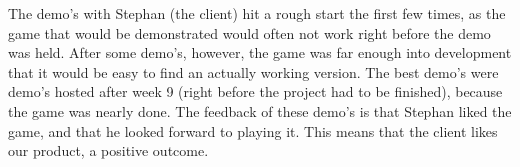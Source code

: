 		The demo's with Stephan (the client) hit a rough start the first few
		times, as the game that would be demonstrated would often not work
		right before the demo was held. After some demo's, however, the game
		was far enough into development that it would be easy to find an
		actually working version. The best demo's were demo's hosted
		after week 9 (right before the project had to be finished), because
		the game was nearly done. The feedback of these demo's is that Stephan
		liked the game, and that he looked forward to playing it. This means
		that the client likes our product, a positive outcome.
		
